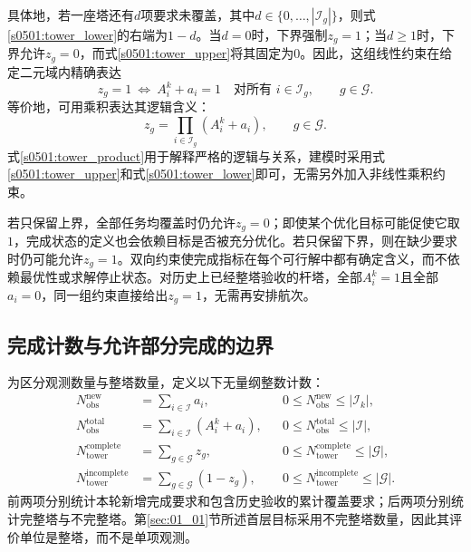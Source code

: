具体地，若一座塔还有$d$项要求未覆盖，其中$d\in\{0,\ldots,|\mathcal I_g|\}$，则式\eqref{s0501:tower_lower}的右端为$1-d$。当$d=0$时，下界强制$z_g=1$；当$d\ge1$时，下界允许$z_g=0$，而式\eqref{s0501:tower_upper}将其固定为$0$。因此，这组线性约束在给定二元域内精确表达
\begin{equation}
 z_g=1
 \ \Longleftrightarrow\ 
 A_i^k+a_i=1\quad\text{对所有 }i\in\mathcal I_g,
 \qquad g\in\mathcal G.
 \label{s0501:tower_equivalence}
\end{equation}
等价地，可用乘积表达其逻辑含义：
\begin{equation}
 z_g=\prod_{i\in\mathcal I_g}(A_i^k+a_i),
 \qquad g\in\mathcal G.
 \label{s0501:tower_product}
\end{equation}
式\eqref{s0501:tower_product}用于解释严格的逻辑与关系，建模时采用式\eqref{s0501:tower_upper}和式\eqref{s0501:tower_lower}即可，无需另外加入非线性乘积约束。

若只保留上界，全部任务均覆盖时仍允许$z_g=0$；即使某个优化目标可能促使它取$1$，完成状态的定义也会依赖目标是否被充分优化。若只保留下界，则在缺少要求时仍可能允许$z_g=1$。双向约束使完成指标在每个可行解中都有确定含义，而不依赖最优性或求解停止状态。对历史上已经整塔验收的杆塔，全部$A_i^k=1$且全部$a_i=0$，同一组约束直接给出$z_g=1$，无需再安排航次。

\subsection{完成计数与允许部分完成的边界}

为区分观测数量与整塔数量，定义以下无量纲整数计数：
\begin{align}
 N_{\mathrm{obs}}^{\mathrm{new}}
 &=\sum_{i\in\mathcal I}a_i,
 &&0\le N_{\mathrm{obs}}^{\mathrm{new}}\le|\mathcal I_k|,
 \label{s0501:new_observation_count}\\
 N_{\mathrm{obs}}^{\mathrm{total}}
 &=\sum_{i\in\mathcal I}(A_i^k+a_i),
 &&0\le N_{\mathrm{obs}}^{\mathrm{total}}\le|\mathcal I|,
 \label{s0501:total_observation_count}\\
 N_{\mathrm{tower}}^{\mathrm{complete}}
 &=\sum_{g\in\mathcal G}z_g,
 &&0\le N_{\mathrm{tower}}^{\mathrm{complete}}\le|\mathcal G|,
 \label{s0501:complete_tower_count}\\
 N_{\mathrm{tower}}^{\mathrm{incomplete}}
 &=\sum_{g\in\mathcal G}(1-z_g),
 &&0\le N_{\mathrm{tower}}^{\mathrm{incomplete}}\le|\mathcal G|.
 \label{s0501:incomplete_tower_count}
\end{align}
前两项分别统计本轮新增完成要求和包含历史验收的累计覆盖要求；后两项分别统计完整塔与不完整塔。第\ref{sec:01_01}节所述首层目标采用不完整塔数量，因此其评价单位是整塔，而不是单项观测。

